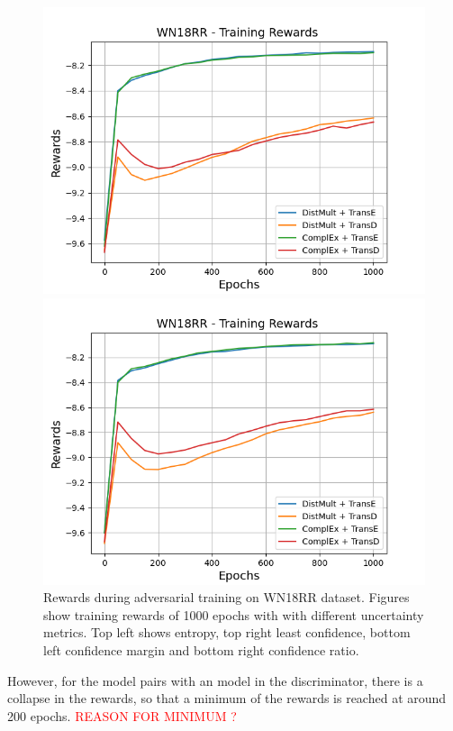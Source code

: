 \begin{figure}
\begin{minipage}{.5\textwidth}
      \centering
      \includegraphics[width=0.9\linewidth]{figures/results/gan_train/not_pretrained/uncertainty/max_distribution/confidence_margin/wn18rr/uncertainty_wn18rr_rew.png}
    \end{minipage}%
    \begin{minipage}{.5\textwidth}
      \centering
      \includegraphics[width=0.9\linewidth]{figures/results/gan_train/not_pretrained/uncertainty/max_distribution/confidence_ratio/wn18rr/uncertainty_wn18rr_rew.png}
    \end{minipage}%
    \caption{Rewards during adversarial training on \textsc{WN18RR} dataset. 
    Figures show training rewards of 1000 epochs with \ussoftmax with different uncertainty metrics.
    Top left shows entropy, top right least confidence, 
    bottom left confidence margin and bottom right confidence ratio.}
    \label{fig:advtrain_metrics_wn18rr_rew}
\end{figure}
However, for the model pairs with an \transd model in the discriminator, there is a collapse in the rewards, so that a minimum of the rewards is reached at around 200 epochs.
\textcolor{red}{REASON FOR MINIMUM ?}

